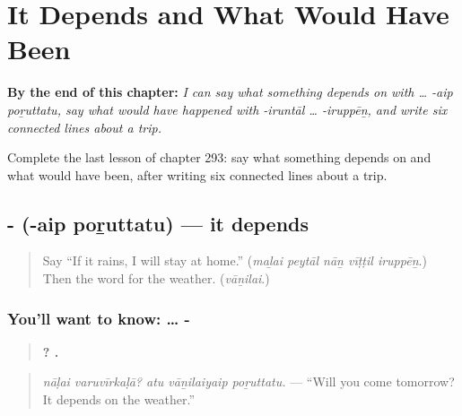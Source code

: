 
\chapter{It Depends and What Would Have Been}
\label{ch:ta-it-depends-and-what-would-have-been}

\begin{chapteropening}
\textbf{By the end of this chapter:} \emph{I can say what something depends on with … -aip poṟuttatu, say what would have happened with -iruntāl … -iruppēṉ, and write six connected lines about a trip.}

Complete the last lesson of chapter 293: say what something depends on and what would have been, after writing six connected lines about a trip.
\end{chapteropening}

\section[\texorpdfstring{-\ta{ஐப்} \ta{பொறுத்தது} (-aip poṟuttatu)}{-ஐப் பொறுத்தது (-aip poṟuttatu)}]{-  (-aip poṟuttatu) — it depends}

\label{lesson:TA-C293-poruttatu}



\begin{quote}
Say \textquotedblleft{}If it rains, I will stay at home.\textquotedblright{} (\emph{maḻai peytāl nāṉ vīṭṭil iruppēṉ}.) Then the word for the weather. (\emph{vāṉilai}.)
\end{quote}

\subsection*{You'll want to know: … - }
\begin{quote}
\textbf{ ?   .}
\end{quote}

\begin{quote}
\emph{nāḷai varuvīrkaḷā? atu vāṉilaiyaip poṟuttatu.} — \textquotedblleft{}Will you come tomorrow? It depends on the weather.\textquotedblright{}
\end{quote}

